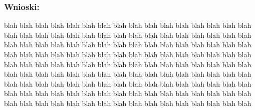 \documentclass[12pt]{article}
\begin{document}
\subsubsection*{Wnioski:}
blah blah blah blah blah blah blah blah 
blah blah blah blah blah blah blah blah 
blah blah blah blah blah blah blah blah 
blah blah blah blah blah blah blah blah 
blah blah blah blah blah blah blah blah 
blah blah blah blah blah blah blah blah 
blah blah blah blah blah blah blah blah 
blah blah blah blah blah blah blah blah 
blah blah blah blah blah blah blah blah 
blah blah blah blah blah blah blah blah 
blah blah blah blah blah blah blah blah 
blah blah blah blah blah blah blah blah 
blah blah blah blah blah blah blah blah 
blah blah blah blah blah blah blah blah 
blah blah blah blah blah blah blah blah 
blah blah blah blah blah blah blah blah 
blah blah blah blah blah blah blah blah 
blah blah blah blah blah blah blah blah 
\end{document}
